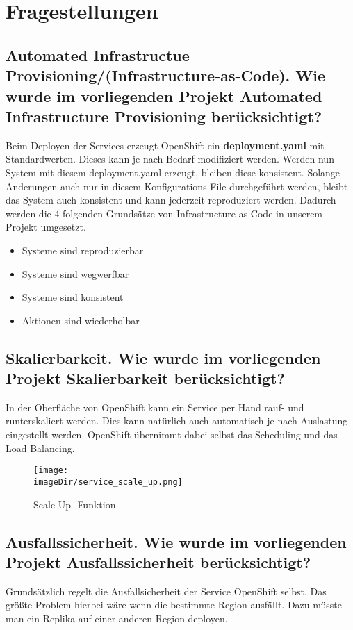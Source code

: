 \documentclass[11pt, a4paper]{article}   	%
\newcommand{\imageDir}{images}
\begin{document}
\section{Fragestellungen}
\subsection{Automated Infrastructue Provisioning/(Infrastructure-as-Code). Wie wurde im vorliegenden Projekt Automated Infrastructure Provisioning berücksichtigt?}
Beim Deployen der Services erzeugt OpenShift ein \textbf{deployment.yaml} mit Standardwerten. Dieses kann je nach Bedarf modifiziert werden. Werden nun System mit diesem deployment.yaml erzeugt, bleiben diese konsistent. Solange Änderungen auch nur in diesem Konfigurations-File durchgeführt werden, bleibt das System auch konsistent und kann jederzeit reproduziert werden.
Dadurch werden die 4 folgenden Grundsätze von Infrastructure as Code in unserem Projekt umgesetzt.

\begin{itemize}
	\item Systeme sind reproduzierbar
	\item Systeme sind wegwerfbar
	\item Systeme sind konsistent
	\item Aktionen sind wiederholbar
\end{itemize}


\subsection{Skalierbarkeit. Wie wurde im vorliegenden Projekt Skalierbarkeit berücksichtigt?}
In der Oberfläche von OpenShift kann ein Service per Hand rauf- und runterskaliert werden. Dies kann natürlich auch automatisch je nach Auslastung eingestellt werden.
OpenShift übernimmt dabei selbst das Scheduling und das Load Balancing.
\begin{figure}[H]
	\centering
	\texttt{[image: \\imageDir/service\_scale\_up.png]}
	\caption{Scale Up- Funktion}
\end{figure}


\subsection{Ausfallssicherheit.  Wie wurde im vorliegenden Projekt Ausfallssicherheit berücksichtigt?}
Grundsätzlich regelt die Ausfallsicherheit der Service OpenShift selbst. Das größte Problem hierbei wäre wenn die bestimmte Region ausfällt. Dazu müsste man ein Replika auf einer anderen Region deployen.
\end{document}
